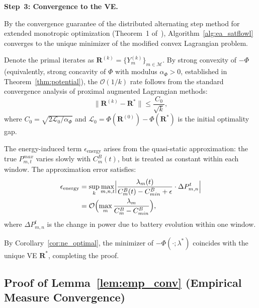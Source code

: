 \documentclass[journal]{IEEEtran}
\newcommand{\CB}{C^{B}}
\newcommand{\CBmin}{C^{B}_{min}}
\newcommand{\calM}{\mathcal{M}}
\newcommand{\bfR}{\mathbf{R}}
\begin{document}
\begin{IEEEproof}
\smallskip
\noindent\textbf{Step~3: Convergence to the VE.}

By the convergence guarantee of the distributed alternating step method for extended monotropic optimization (Theorem~1 of~\cite{cen2024satflow}), Algorithm~\ref{alg:ea_satflowl} converges to the unique minimizer of the modified convex Lagrangian problem.

Denote the primal iterates as $\bfR^{(k)} = \{Y_m^{(k)}\}_{m\in\calM}$. By strong convexity of $-\Phi$ (equivalently, strong concavity of $\Phi$ with modulus $\alpha_\Phi > 0$, established in Theorem~\ref{thm:potential}), the $\mathcal{O}(1/k)$ rate follows from the standard convergence analysis of proximal augmented Lagrangian methods:
\begin{equation}
    \|\bfR^{(k)} - \bfR^*\|
    \leq \frac{C_0}{\sqrt{k}},
\end{equation}
where $C_0 = \sqrt{2\mathcal{L}_0/\alpha_\Phi}$ and $\mathcal{L}_0 = \Phi(\bfR^{(0)}) - \Phi(\bfR^*)$ is the initial optimality gap.

The energy-induced term $\epsilon_{\mathrm{energy}}$ arises from the quasi-static approximation: the true $P_{m,t}^{max}$ varies slowly with $\CB_m(t)$, but is treated as constant within each window. The approximation error satisfies:
\begin{align}
    \epsilon_{\mathrm{energy}}
    &= \sup_k \max_{m,n,t}
    \Bigl|\frac{\lambda_m(t)}%
    {\CB_m(t)-\CBmin+\epsilon}
    \cdot \Delta P_{m,n}^t\Bigr|
    \notag\\
    &= \mathcal{O}\Bigl(\max_m
    \frac{\lambda_m}{\CB_m-\CBmin}\Bigr),
\end{align}
where $\Delta P_{m,n}^t$ is the change in power due to battery evolution within one window.

By Corollary~\ref{cor:ne_optimal}, the minimizer of $-\Phi(\cdot;\lambda^*)$ coincides with the unique VE $\bfR^*$, completing the proof.

\end{IEEEproof}

\subsection{Proof of Lemma~\ref{lem:emp_conv}
(Empirical Measure Convergence)}
\end{document}
